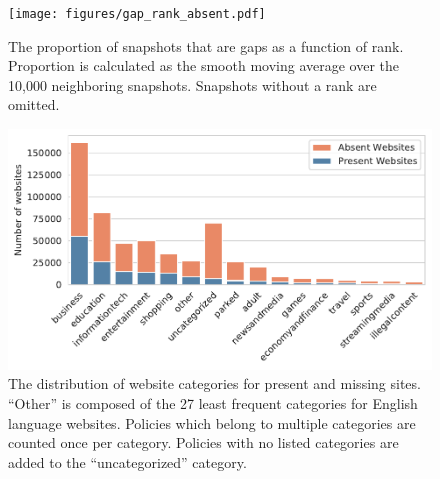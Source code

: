 \begin{figure}[t]
\centering
\texttt{[image: figures/gap\_rank\_absent.pdf]}
\caption{The proportion of snapshots that are gaps as a function of rank. Proportion is calculated as the smooth moving average over the 10,000 neighboring snapshots. Snapshots without a rank are omitted. }
\label{fig:rank_absent}
\end{figure}



\begin{figure}[t]
\label{fig:cat_dist}
\centering
\includegraphics[width=1\columnwidth]{figures/category_dist.pdf}

\caption{The distribution of website categories for present and missing sites. ``Other'' is composed of the 27 least frequent categories for English language websites. Policies which belong to multiple categories are counted once per category. Policies with no listed categories are added to the ``uncategorized'' category.}
\label{fig:categories}
\end{figure}


